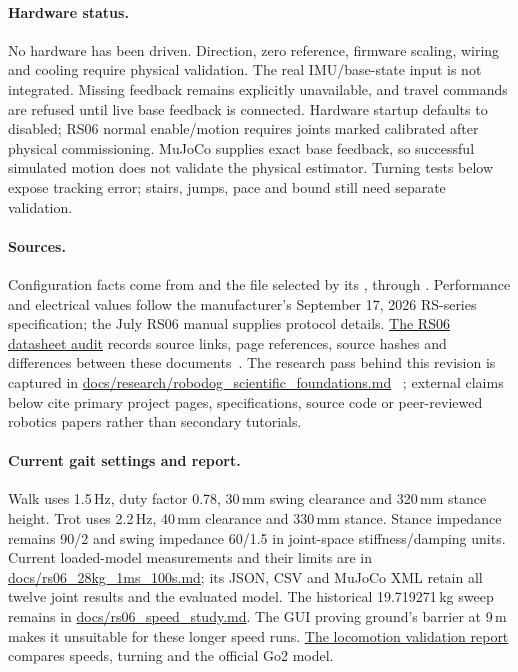 \documentclass[11pt,a4paper]{article}
\begin{document}
\paragraph{Hardware status.} No hardware has been driven. Direction, zero
reference, firmware scaling, wiring and cooling require physical validation.
The real IMU/base-state input is not integrated. Missing feedback remains
explicitly unavailable, and travel commands are refused until live base feedback
is connected. Hardware startup defaults to disabled; RS06 normal enable/motion
requires joints marked calibrated after physical commissioning.
MuJoCo supplies exact base feedback, so successful simulated motion does not
validate the physical estimator. Turning tests below expose tracking error;
stairs, jumps, pace and bound still need separate validation.

\paragraph{Sources.} Configuration facts come from
 and the file selected by its
, through .
Performance and electrical values follow the manufacturer's September 17, 2026
RS-series specification; the July RS06 manual supplies protocol details.
\href{rs06_datasheet_audit.md}{The RS06 datasheet audit} records source links,
page references, source hashes and differences between these
documents~\cite{robstride-spec,robstride-manual,robstride-audit}.
The research pass behind this revision is captured in
\href{research/robodog_scientific_foundations.md}{docs/research/robodog\_scientific\_foundations.md}
~\cite{scientific-foundations};
external claims below cite primary project pages, specifications, source code
or peer-reviewed robotics papers rather than secondary tutorials.

\paragraph{Current gait settings and report.} Walk uses 1.5\,Hz, duty
factor 0.78, 30\,mm swing clearance and 320\,mm stance height. Trot uses 2.2\,Hz, 40\,mm clearance
and 330\,mm stance. Stance impedance remains 90/2 and swing impedance 60/1.5
in joint-space stiffness/damping units. Current loaded-model measurements and
their limits are in
\href{rs06_28kg_1ms_100s.md}{docs/rs06\_28kg\_1ms\_100s.md}; its JSON, CSV and
MuJoCo XML retain all twelve joint results and the evaluated model. The
historical 19.719271\,kg sweep remains in
\href{rs06_speed_study.md}{docs/rs06\_speed\_study.md}.
The GUI proving ground's barrier at 9\,m makes it unsuitable for these longer
speed runs. \href{locomotion_validation.md}{The locomotion validation report}
compares speeds, turning and the official Go2 model.
\end{document}
